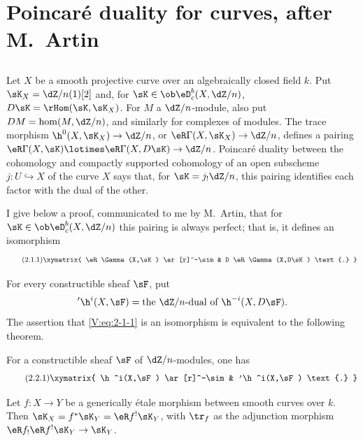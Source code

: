 \section{Poincaré duality for curves, after M.\ Artin}\label{V:2}


\subsection{}\label{V:2-1}

Let $X$ be a smooth projective curve over an algebraically closed field $k$.
Put $\sK_X=\dZ/n(1)[2]$ and, for $\sK\in\ob \eD_c^b(X,\dZ/n)$,
$D\sK=\rHom(\sK,\sK_X)$. For $M$ a $\dZ/n$-module, also put
$D M = \hom(M,\dZ/n)$, and similarly for complexes of modules. The trace
morphism $\h^0(X,\sK_X) \to \dZ/n$, or
$\eR\Gamma(X,\sK_X)\to \dZ/n$, defines a pairing
$\eR\Gamma(X,\sK)\lotimes\eR\Gamma(X,D\sK) \to \dZ/n$. Poincaré duality
between the cohomology and compactly supported cohomology of an open
subscheme $j:U\hookrightarrow X$ of the curve $X$ says that, for
$\sK=j_!\dZ/n$, this pairing identifies each factor with the dual of the
other.

I give below a proof, communicated to me by M.\ Artin, that for
$\sK\in\ob\eD_c^b(X,\dZ/n)$ this pairing is always perfect; that is, it
defines an isomorphism
\begin{equation*}\tag{2.1.1}\label{V:eq:2-1-1}
\xymatrix{
  \eR\Gamma(X,\sK) \ar[r]^-\sim
    & D \eR\Gamma(X,D\sK) \text{.}
}
\end{equation*}

For every constructible sheaf $\sF$, put
\[
  '\h^i(X,\sF) = \text{the $\dZ/n$-dual of $\h^{-i}(X,D\sF)$.}
\]
The assertion that \eqref{V:eq:2-1-1} is an isomorphism is equivalent to the
following theorem.


\begin{theorem_}\label{V:2-2}
For a constructible sheaf $\sF$ of $\dZ/n$-modules, one has
\begin{equation*}\tag{2.2.1}\label{V:eq:2-2-1}
\xymatrix{
  \h^i(X,\sF) \ar[r]^-\sim
    & '\h^i(X,\sF) \text{.}
}
\end{equation*}
\end{theorem_}


\begin{lemma_}\label{V:2-3}
Let $f:X\to Y$ be a generically étale morphism between smooth curves over
$k$. Then $\sK_X=f^\ast\sK_Y=\eR f^!\sK_Y$, with $\tr_f$ as the adjunction
morphism $\eR f_!\eR f^!\sK_Y\to \sK_Y$.
\end{lemma_}

